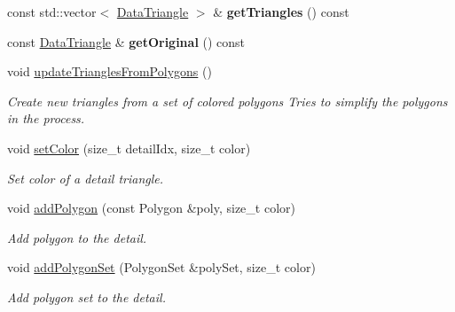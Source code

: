 \begin{DoxyCompactItemize}
const std\+::vector$<$ \mbox{\hyperlink{classpepr3d_1_1_data_triangle}{Data\+Triangle}} $>$ \& {\bfseries get\+Triangles} () const
\item 
\mbox{\label{classpepr3d_1_1_triangle_detail_ac206277a3049356735f0f8f3294ad3a8}} 
const \mbox{\hyperlink{classpepr3d_1_1_data_triangle}{Data\+Triangle}} \& {\bfseries get\+Original} () const
\item 
\mbox{\label{classpepr3d_1_1_triangle_detail_a55836364f8bca5dce29da4a7320adf65}} 
void \mbox{\hyperlink{classpepr3d_1_1_triangle_detail_a55836364f8bca5dce29da4a7320adf65}{update\+Triangles\+From\+Polygons}} ()
\begin{DoxyCompactList}\small\item\em Create new triangles from a set of colored polygons Tries to simplify the polygons in the process. \end{DoxyCompactList}\item 
\mbox{\label{classpepr3d_1_1_triangle_detail_ab27f8b435c7c88f80eb35caac5ae9d34}} 
void \mbox{\hyperlink{classpepr3d_1_1_triangle_detail_ab27f8b435c7c88f80eb35caac5ae9d34}{set\+Color}} (size\+\_\+t detail\+Idx, size\+\_\+t color)
\begin{DoxyCompactList}\small\item\em Set color of a detail triangle. \end{DoxyCompactList}\item 
void \mbox{\hyperlink{classpepr3d_1_1_triangle_detail_a5a7bf09704143a299bb2d6261d540729}{add\+Polygon}} (const Polygon \&poly, size\+\_\+t color)
\begin{DoxyCompactList}\small\item\em Add polygon to the detail. \end{DoxyCompactList}\item 
void \mbox{\hyperlink{classpepr3d_1_1_triangle_detail_af1656510445bacca593a631571f83c7f}{add\+Polygon\+Set}} (Polygon\+Set \&poly\+Set, size\+\_\+t color)
\begin{DoxyCompactList}\small\item\em Add polygon set to the detail. \end{DoxyCompactList}\item 
\mbox{\label{classpepr3d_1_1_triangle_detail_a3d8d23f8835e264356b503cc495c71e4}} 

\end{DoxyCompactItemize}
